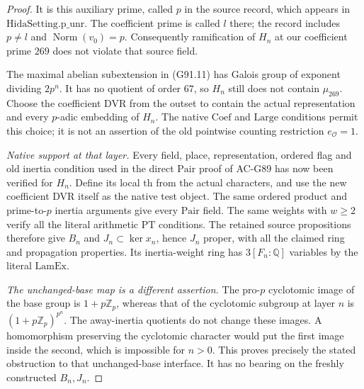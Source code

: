 \begin{proof}
It is this auxiliary prime, called $p$ in the source record,
which appears in $\mathrm{HidaSetting.p\_unr}$.
The coefficient prime is called $l$ there; the record includes
$p\ne l$ and $\operatorname{Norm}(v_0)=p$.
Consequently ramification of $H_n$ at our coefficient prime
$269$ does not violate that source field.

The maximal abelian subextension in (G91.11) has Galois
group of exponent dividing $2p^n$.  It has no quotient of
order $67$, so $H_n$ still does not contain $\mu_{269}$.
Choose the coefficient DVR from the outset to contain the
actual representation and every $p$-adic embedding of $H_n$.
The native $\mathrm{Coef}$ and $\mathrm{Large}$ conditions
permit this choice; it is not an assertion of the old
pointwise counting restriction $e_{\mathcal O}=1$.

\emph{Native support at that layer.}
Every field, place, representation, ordered flag and old
inertia condition used in the direct $\mathrm{Pair}$ proof
of AC-G89 has now been verified for $H_n$.
Define its local $\mathrm{th}$ from the actual characters,
and use the new coefficient DVR itself as the native test
object.  The same ordered product and prime-to-$p$ inertia
arguments give every $\mathrm{Pair}$ field.
The same weights with $w\geq2$ verify all the literal
arithmetic $\mathrm{PT}$ conditions.
The retained source propositions therefore give $B_n$ and
$J_n\subset\ker x_n$, hence $J_n$ proper, with all the
claimed ring and propagation properties.
Its inertia-weight ring has $3[F_n:\mathbb Q]$ variables
by the literal $\mathrm{LamEx}$.

\emph{The unchanged-base map is a different assertion.}
The pro-$p$ cyclotomic image of the base group is
$1+p\mathbb Z_p$, whereas that of the cyclotomic subgroup
at layer $n$ is $(1+p\mathbb Z_p)^{p^n}$.
The away-inertia quotients do not change these images.
A homomorphism preserving the cyclotomic character would
put the first image inside the second, which is impossible
for $n>0$.  This proves precisely the stated obstruction
to that unchanged-base interface.  It has no bearing on
the freshly constructed $B_n,J_n$.
\end{proof}

